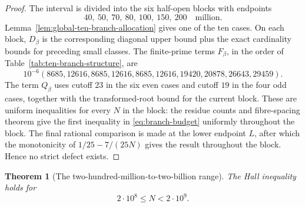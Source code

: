 \documentclass[11pt]{article}
\newtheorem{theorem}{Theorem}[section]
\theoremstyle{definition}
\newcommand{\TwoHundredMillion}{2\cdot10^8}
\newcommand{\TwoBillion}{2\cdot10^9}
\begin{document}
\begin{proof}
The interval is divided into the six half-open blocks with endpoints
\[
 40,\ 50,\ 70,\ 80,\ 100,\ 150,\ 200
\quad\text{million}.
\]
 Lemma~\ref{lem:global-ten-branch-allocation} gives one of the ten cases.  On each
block, $D_\beta$ is the corresponding diagonal upper bound plus the exact
cardinality bounds for preceding small classes.  The finite-prime terms
$F_\beta$, in the order of Table~\ref{tab:ten-branch-structure}, are
\[
 10^{-6}(8685,12616,8685,12616,8685,12616,
 19420,20878,26643,29459).
\]
The term $Q_\beta$ uses cutoff $23$ in the six even cases and cutoff $19$
in the four odd cases, together with the transformed-root bound for the
current block.  These are uniform inequalities for every $N$ in the block:
 the residue counts and fibre-spacing theorem give the first inequality in
 \eqref{eq:branch-budget} uniformly throughout the block.  The
final rational comparison is made at the lower endpoint $L$, after which the
monotonicity of $1/25-7/(25N)$ gives the result throughout the block.  Hence
no strict defect exists.
\end{proof}

\begin{theorem}[The two-hundred-million-to-two-billion range]
\label{thm:actual-support-mixed-close}
The Hall inequality holds for
\[
 \TwoHundredMillion\leq N<\TwoBillion.
\]
\end{theorem}
\end{document}
